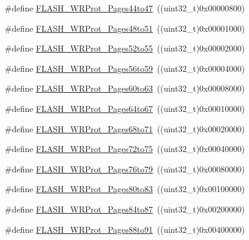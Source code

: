 \begin{DoxyCompactItemize}
\item 
\#define \hyperlink{group___option___bytes___write___protection_gaa2d897455d5f71c9fd3721d49b3578fc}{F\+L\+A\+S\+H\+\_\+\+W\+R\+Prot\+\_\+\+Pages44to47}~((uint32\+\_\+t)0x00000800)
\item 
\#define \hyperlink{group___option___bytes___write___protection_gac6bb79080cb276b330499f26c706048e}{F\+L\+A\+S\+H\+\_\+\+W\+R\+Prot\+\_\+\+Pages48to51}~((uint32\+\_\+t)0x00001000)
\item 
\#define \hyperlink{group___option___bytes___write___protection_gab5beefbfebf060f71421995f3c7a6418}{F\+L\+A\+S\+H\+\_\+\+W\+R\+Prot\+\_\+\+Pages52to55}~((uint32\+\_\+t)0x00002000)
\item 
\#define \hyperlink{group___option___bytes___write___protection_ga3705c210feeeb63c31976495c0b851f1}{F\+L\+A\+S\+H\+\_\+\+W\+R\+Prot\+\_\+\+Pages56to59}~((uint32\+\_\+t)0x00004000)
\item 
\#define \hyperlink{group___option___bytes___write___protection_ga1978945fc02d1867900f17c4999c50d5}{F\+L\+A\+S\+H\+\_\+\+W\+R\+Prot\+\_\+\+Pages60to63}~((uint32\+\_\+t)0x00008000)
\item 
\#define \hyperlink{group___option___bytes___write___protection_ga124928d6134ddac13e3e8810a0d8dd1a}{F\+L\+A\+S\+H\+\_\+\+W\+R\+Prot\+\_\+\+Pages64to67}~((uint32\+\_\+t)0x00010000)
\item 
\#define \hyperlink{group___option___bytes___write___protection_gafbb813885c6cd505c64083f2f88532fb}{F\+L\+A\+S\+H\+\_\+\+W\+R\+Prot\+\_\+\+Pages68to71}~((uint32\+\_\+t)0x00020000)
\item 
\#define \hyperlink{group___option___bytes___write___protection_ga1a19c52012bbb30f3ae1599fa5a200cc}{F\+L\+A\+S\+H\+\_\+\+W\+R\+Prot\+\_\+\+Pages72to75}~((uint32\+\_\+t)0x00040000)
\item 
\#define \hyperlink{group___option___bytes___write___protection_ga9e1f9abfa57766312c6cbae9b42f3ab6}{F\+L\+A\+S\+H\+\_\+\+W\+R\+Prot\+\_\+\+Pages76to79}~((uint32\+\_\+t)0x00080000)
\item 
\#define \hyperlink{group___option___bytes___write___protection_ga5749428874f99f77a5c5fc48a88816d9}{F\+L\+A\+S\+H\+\_\+\+W\+R\+Prot\+\_\+\+Pages80to83}~((uint32\+\_\+t)0x00100000)
\item 
\#define \hyperlink{group___option___bytes___write___protection_ga9dbf7aeb5b54b42f9b345c95d00eaf32}{F\+L\+A\+S\+H\+\_\+\+W\+R\+Prot\+\_\+\+Pages84to87}~((uint32\+\_\+t)0x00200000)
\item 
\#define \hyperlink{group___option___bytes___write___protection_gaeece6aa5e198239067c47f678b9d015e}{F\+L\+A\+S\+H\+\_\+\+W\+R\+Prot\+\_\+\+Pages88to91}~((uint32\+\_\+t)0x00400000)

\end{DoxyCompactItemize}
